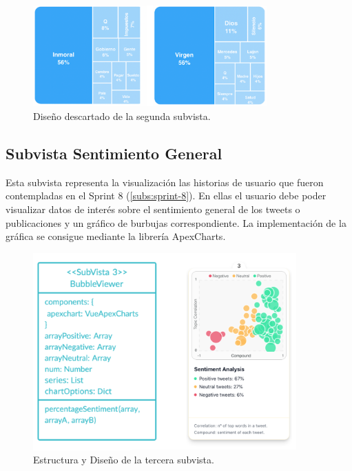 \begin{figure}[H]
    \centering
    \myfloatalign
    \includegraphics[width=0.8\textwidth]{gfx/subvista2-descartada.png}
    \caption[Diseño descartado de la segunda subvista]{Diseño descartado de la segunda subvista.}\label{gfx:subvista2-descartada}
\end{figure}

\subsection{Subvista Sentimiento General}
Esta subvista representa la visualización las historias de usuario que fueron contempladas en el Sprint 8 (\ref{subs:sprint-8}). En ellas el usuario debe poder visualizar datos de interés sobre el sentimiento general de los tweets o publicaciones y un gráfico de burbujas correspondiente. La implementación de la gráfica se consigue mediante la librería ApexCharts.

\begin{figure}[H]
    \centering
    \myfloatalign
    \includegraphics[width=0.9\textwidth]{gfx/subvista4.png}
    \caption[Estructura y Diseño de la tercera subvista]{Estructura y Diseño de la tercera subvista.}\label{gfx:subvista4}
\end{figure}

